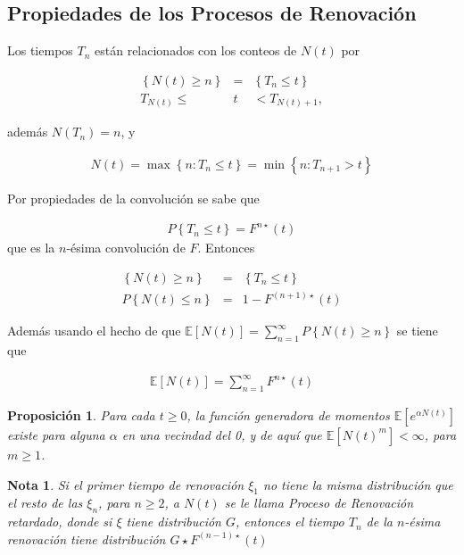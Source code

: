 \documentclass{article}
\newtheorem{Note}{Nota}
\newtheorem{Prop}{Proposición}
\newcommand{\esp}{\mathbb{E}}
\begin{document}
\subsection{Propiedades de los Procesos de Renovaci\'on}
%

Los tiempos $T_{n}$ est\'an relacionados con los conteos de $N\left(t\right)$ por

\begin{eqnarray*}
\left\{N\left(t\right)\geq n\right\}&=&\left\{T_{n}\leq t\right\}\\
T_{N\left(t\right)}\leq &t&<T_{N\left(t\right)+1},
\end{eqnarray*}

adem\'as $N\left(T_{n}\right)=n$, y 

\begin{eqnarray*}
N\left(t\right)=\max\left\{n:T_{n}\leq t\right\}=\min\left\{n:T_{n+1}>t\right\}
\end{eqnarray*}

Por propiedades de la convoluci\'on se sabe que

\begin{eqnarray*}
P\left\{T_{n}\leq t\right\}=F^{n\star}\left(t\right)
\end{eqnarray*}
que es la $n$-\'esima convoluci\'on de $F$. Entonces 

\begin{eqnarray*}
\left\{N\left(t\right)\geq n\right\}&=&\left\{T_{n}\leq t\right\}\\
P\left\{N\left(t\right)\leq n\right\}&=&1-F^{\left(n+1\right)\star}\left(t\right)
\end{eqnarray*}

Adem\'as usando el hecho de que $\esp\left[N\left(t\right)\right]=\sum_{n=1}^{\infty}P\left\{N\left(t\right)\geq n\right\}$
se tiene que

\begin{eqnarray*}
\esp\left[N\left(t\right)\right]=\sum_{n=1}^{\infty}F^{n\star}\left(t\right)
\end{eqnarray*}

\begin{Prop}
Para cada $t\geq0$, la funci\'on generadora de momentos $\esp\left[e^{\alpha N\left(t\right)}\right]$ existe para alguna $\alpha$ en una vecindad del 0, y de aqu\'i que $\esp\left[N\left(t\right)^{m}\right]<\infty$, para $m\geq1$.
\end{Prop}


\begin{Note}
Si el primer tiempo de renovaci\'on $\xi_{1}$ no tiene la misma distribuci\'on que el resto de las $\xi_{n}$, para $n\geq2$, a $N\left(t\right)$ se le llama Proceso de Renovaci\'on retardado, donde si $\xi$ tiene distribuci\'on $G$, entonces el tiempo $T_{n}$ de la $n$-\'esima renovaci\'on tiene distribuci\'on $G\star F^{\left(n-1\right)\star}\left(t\right)$
\end{Note}
\end{document}
